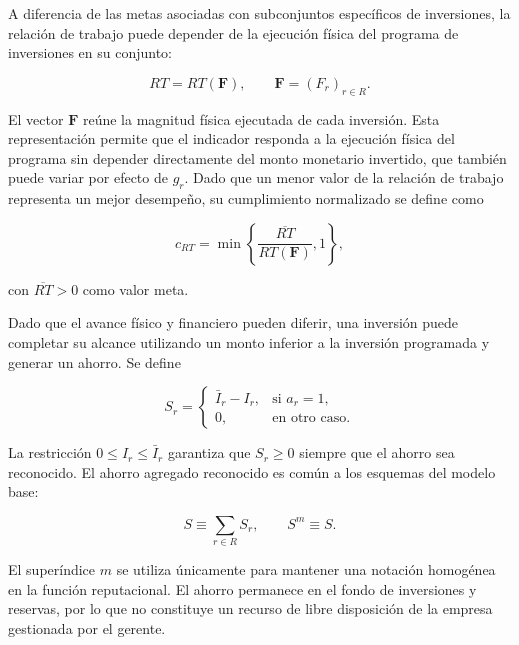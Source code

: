 A diferencia de las metas asociadas con subconjuntos específicos de inversiones, la relación de trabajo puede depender de la ejecución física del programa de inversiones en su conjunto:

\begin{equation}
\label{eq:relacion_trabajo}
RT
=
RT(\mathbf F),
\qquad
\mathbf F=(F_r)_{r\in R}.
\end{equation}

El vector \(\mathbf F\) reúne la magnitud física ejecutada de cada inversión. Esta representación permite que el indicador responda a la ejecución física del programa sin depender directamente del monto monetario invertido, que también puede variar por efecto de \(g_r\). Dado que un menor valor de la relación de trabajo representa un mejor desempeño, su cumplimiento normalizado se define como

\begin{equation}
\label{eq:cumplimiento_rt}
c_{RT}
=
\min
\left\{
\frac{\overline{RT}}
{RT(\mathbf F)},
1
\right\},
\end{equation}

con \(\overline{RT}>0\) como valor meta.

Dado que el avance físico y financiero pueden diferir, una inversión puede completar su alcance utilizando un monto inferior a la inversión programada y generar un ahorro. Se define

\begin{equation}
\label{eq:ahorro_inversion}
S_r
=
\begin{cases}
\bar I_r-I_r,
&
\text{si } a_r=1,
\\[4pt]
0,
&
\text{en otro caso}.
\end{cases}
\end{equation}

La restricción \(0\leq I_r\leq\bar I_r\) garantiza que \(S_r\geq0\) siempre que el ahorro sea reconocido. El ahorro agregado reconocido es común a los esquemas del modelo base:

\begin{equation}
\label{eq:ahorro_agregado}
S
\equiv
\sum_{r\in R}S_r,
\qquad
S^m\equiv S.
\end{equation}

El superíndice \(m\) se utiliza únicamente para mantener una notación homogénea en la función reputacional. El ahorro permanece en el fondo de inversiones y reservas, por lo que no constituye un recurso de libre disposición de la empresa gestionada por el gerente.

